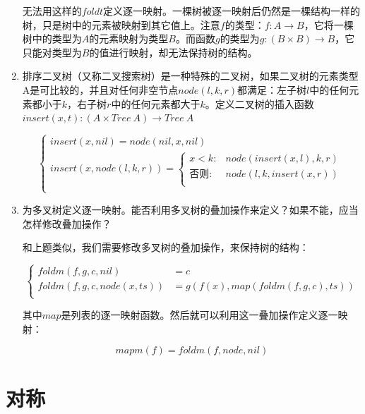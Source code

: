\documentclass[UTF8]{article}
\begin{document}
\begin{enumerate}
无法用这样的$foldt$定义逐一映射。一棵树被逐一映射后仍然是一棵结构一样的树，只是树中的元素被映射到其它值上。注意$f$的类型：$f : A \to B$，它将一棵树中的类型为$A$的元素映射为类型$B$。而函数$g$的类型为$g : (B \times B) \to B$，它只能对类型为$B$的值进行映射，却无法保持树的结构。

\item 排序二叉树（又称二叉搜索树）是一种特殊的二叉树，如果二叉树的元素类型A是可比较的，并且对任何非空节点$node(l, k, r)$都满足：左子树$l$中的任何元素都小于$k$，右子树$r$中的任何元素都大于$k$。定义二叉树的插入函数$insert(x, t) : (A \times Tree\ A) \to Tree\ A$

\[ \begin{cases}
insert(x, nil) = node(nil, x, nil) \\
insert(x, node(l, k, r)) = \begin{cases}
  x < k: & node(insert(x, l), k, r) \\
  \text{否则}: & node(l, k, insert(x, r)) \\
\end{cases} \\
\end{cases}\]

\item 为多叉树定义逐一映射。能否利用多叉树的叠加操作来定义？如果不能，应当怎样修改叠加操作？

和上题类似，我们需要修改多叉树的叠加操作，来保持树的结构：

\[
\begin{cases}
foldm(f, g, c, nil) & = c \\
foldm(f, g, c, node(x, ts)) & = g(f(x), map(foldm(f, g, c), ts)) \\
\end{cases}
\]

其中$map$是列表的逐一映射函数。然后就可以利用这一叠加操作定义逐一映射：

\[
mapm(f) = foldm(f, node, nil)
\]

\end{enumerate}

\section{对称}
\end{document}
